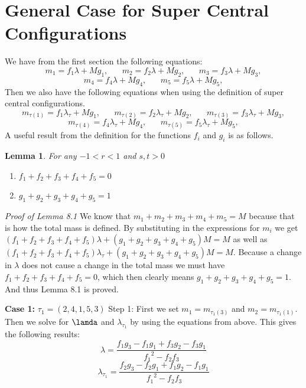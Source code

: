 \documentclass[11pt,leqno]{article}
\newtheorem{lemma}[theorem]{Lemma}
\theoremstyle{definition}
\theoremstyle{remark}
\numberwithin{equation}{section}
\begin{document}
\section{General Case for Super Central Configurations}
We have from the first section the following equations:
$$m_1=f_1\lambda+Mg_1, \hspace{20pt} m_2=f_2\lambda+Mg_2, \hspace{20pt} m_3=f_3\lambda+Mg_3,$$
$$m_4=f_4\lambda+Mg_4, \hspace{20pt} m_5=f_5\lambda+Mg_5,$$
Then we also have the following equations when using the definition of super central configurations.
$$m_{\tau(1)}=f_1\lambda_\tau+Mg_1, \hspace{20pt} m_{\tau(2)}=f_2\lambda_\tau+Mg_2, \hspace{20pt} m_{\tau(3)}=f_3\lambda_\tau+Mg_3,$$
$$m_{\tau(4)}=f_4\lambda_\tau+Mg_4, \hspace{20pt} m_{\tau(5)}=f_5\lambda_\tau+Mg_5,$$
A useful result from the definition for the functions $f_i$ and $g_i$ is as follows.
\begin{lemma}
For any $-1<r<1$ and $s,t>0$
\begin{enumerate}
\item $f_1+f_2+f_3+f_4+f_5=0$
\item $g_1+g_2+g_3+g_4+g_5=1$
\end{enumerate}
\end{lemma}
\textit{Proof of Lemma 8.1}
We know that $m_1+m_2+m_3+m_4+m_5=M$ because that is how the total mass is defined. By substituting in the expressions for $m_i$ we get $(f_1+f_2+f_3+f_4+f_5)\lambda+(g_1+g_2+g_3+g_4+g_5)M=M$ as well as $(f_1+f_2+f_3+f_4+f_5)\lambda_\tau+(g_1+g_2+g_3+g_4+g_5)M=M$. 
Because a change in $\lambda$ does not cause a change in the total mass we must have $f_1+f_2+f_3+f_4+f_5=0$, which then clearly means $g_1+g_2+g_3+g_4+g_5=1$. And thus Lemma 8.1 is proved.


\textbf{Case 1:} $\tau_1=(2,4,1,5,3)$
Step 1: First we set $m_1=m_{\tau_1(3)}$ and $m_2=m_{\tau_1(1)}$. Then we solve for $\lamda$ and $\lambda_\tau_1$ by using the equations from above. This gives the following results:
$$\lambda=\frac{f_1g_3-f_1g_1+f_3g_2-f_3g_1}{{f_1}^2-f_2f_3}$$
$$\lambda_{\tau_1}=\frac{f_2g_3-f_2g_1+f_1g_2-f_1g_1}{{f_1}^2-f_2f_3}$$
\end{document}
